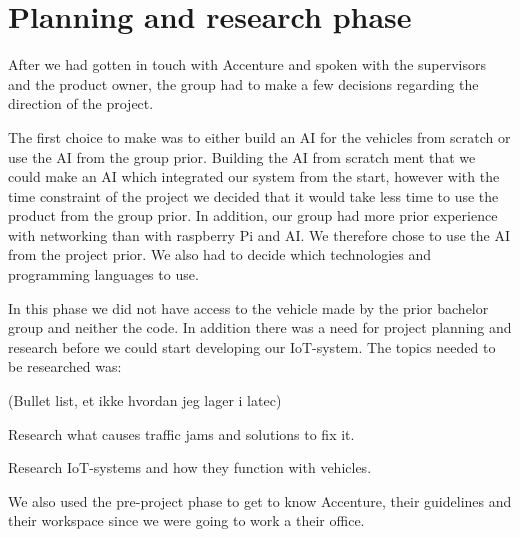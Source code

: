 \section{Planning and research phase}

After we had gotten in touch with Accenture and spoken with the supervisors and the product owner, the group had to make a few decisions regarding the direction of the project.

The first choice to make was to either build an AI for the vehicles from scratch or use the AI from the group prior. Building the AI from scratch ment that we could make an AI which integrated our system from the start, however with the time constraint of the project we decided that it would take less time to use the product from the group prior. In addition, our group had more prior experience with networking than with raspberry Pi and AI. We therefore chose to use the AI from the project prior. We also had to decide which technologies and programming languages to use.

In this phase we did not have access to the vehicle made by the prior bachelor group and neither the code. In addition there was a need for project planning and research before we could start developing our IoT-system. The topics needed to be researched was:

(Bullet list, et ikke hvordan jeg lager i latec)

Research what causes traffic jams and solutions to fix it.

Research IoT-systems and how they function with vehicles.

We also used the pre-project phase to get to know Accenture, their guidelines and their workspace since we were going to work a their office. 









